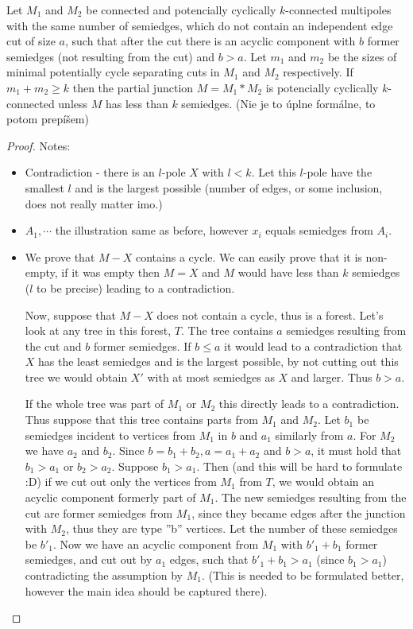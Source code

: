 \documentclass[12pt, twoside]{book}
\begin{document}
\begin{theorem}\label{th:connecting-potencially-k-connected}
	Let $M_1$ and $M_2$ be connected and potencially cyclically $k$-connected multipoles with the same number of semiedges, which do not contain an independent edge cut of size $a$, such that after the cut there is an acyclic component with $b$ former semiedges (not resulting from the cut) and $b>a$. Let $m_1$ and $m_2$ be the sizes of minimal potentially cycle separating cuts in $M_1$ and $M_2$ respectively. If $m_1+m_2\geq k$ then the partial junction $M=M_1*M_2$ is potencially cyclically $k$-connected unless $M$ has less than $k$ semiedges. (Nie je to úplne formálne, to potom prepíšem)
\end{theorem}

\begin{proof}
	Notes:
	\begin{itemize}
		\item Contradiction - there is an $l$-pole $X$ with $l<k$. Let this $l$-pole have the smallest $l$ and is the largest possible (number of edges, or some inclusion, does not really matter imo.)
		\item $A_1,\cdots$ the illustration same as before, however $x_i$ equals semiedges from $A_i$.
		\item We prove that $M-X$ contains a cycle. We can easily prove that it is non-empty, if it was empty then $M=X$ and $M$ would have less than $k$ semiedges ($l$ to be precise) leading to a contradiction.
		
		Now, suppose that $M-X$ does not contain a cycle, thus is a forest. Let's look at any tree in this forest, $T$. The tree contains $a$ semiedges resulting from the cut and $b$ former semiedges. If $b\leq a$ it would lead to a contradiction that $X$ has the least semiedges and is the largest possible, by not cutting out this tree we would obtain $X'$ with at most semiedges as $X$ and larger. Thus $b>a$. 
		
		If the whole tree was part of $M_1$ or $M_2$ this directly leads to a contradiction. Thus suppose that this tree contains parts from $M_1$ and $M_2$. Let $b_1$ be semiedges incident to vertices from $M_1$ in $b$ and $a_1$ similarly from $a$. For $M_2$ we have $a_2$ and $b_2$. Since $b=b_1+b_2, a=a_1+a_2$ and $b>a$, it must hold that $b_1>a_1$ or $b_2>a_2$. Suppose $b_1>a_1$. Then (and this will be hard to formulate :D) if we cut out only the vertices from $M_1$ from $T$, we would obtain an acyclic component formerly part of $M_1$. The new semiedges resulting from the cut are former semiedges from $M_1$, since they became edges after the junction with $M_2$, thus they are type ''b'' vertices. Let the number of these semiedges be $b'_1$. Now we have an acyclic component from $M_1$ with $b'_1+b_1$ former semiedges, and cut out by $a_1$ edges, such that $b'_1+b_1>a_1$ (since $b_1>a_1$) contradicting the assumption by $M_1$. (This is needed to be formulated better, however the main idea should be captured there).
		

\end{itemize}
\end{proof}
\end{document}
